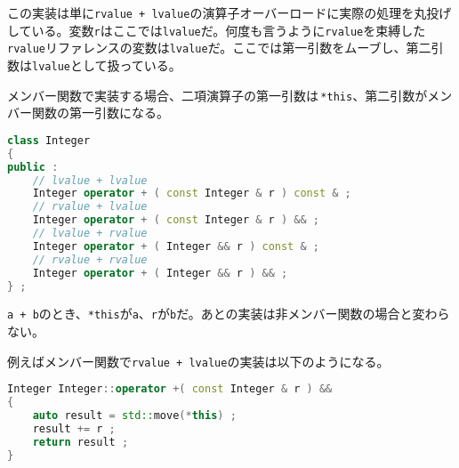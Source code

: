 この実装は単に\texttt{rvalue + lvalue}の演算子オーバーロードに実際の処理を丸投げしている。変数\texttt{r}はここでは\texttt{lvalue}だ。何度も言うように\texttt{rvalue}を束縛した\texttt{rvalue}リファレンスの変数は\texttt{lvalue}だ。ここでは第一引数をムーブし、第二引数は\texttt{lvalue}として扱っている。

メンバー関数で実装する場合、二項演算子の第一引数は\,\texttt{*this}、第二引数がメンバー関数の第一引数になる。

\begin{lstlisting}[language={C++}]
class Integer
{
public :
    // lvalue + lvalue
    Integer operator + ( const Integer & r ) const & ;
    // rvalue + lvalue
    Integer operator + ( const Integer & r ) && ;
    // lvalue + rvalue
    Integer operator + ( Integer && r ) const & ;
    // rvalue + rvalue
    Integer operator + ( Integer && r ) && ;
} ;
\end{lstlisting}

\texttt{a + b}のとき、\texttt{*this}が\texttt{a}、\texttt{r}が\texttt{b}だ。あとの実装は非メンバー関数の場合と変わらない。

例えばメンバー関数で\texttt{rvalue + lvalue}の実装は以下のようになる。

\begin{lstlisting}[language={C++}]
Integer Integer::operator +( const Integer & r ) &&
{
    auto result = std::move(*this) ;
    result += r ;
    return result ;
}
\end{lstlisting}

